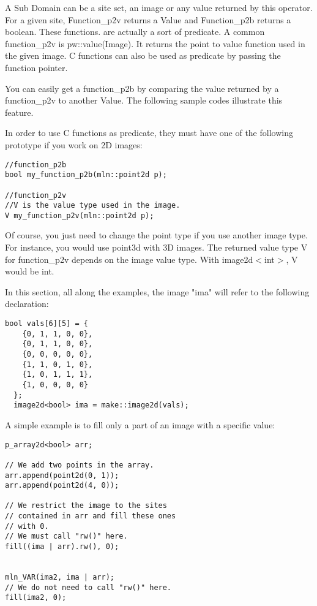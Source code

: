 \documentclass{report}
\begin{document}
A Sub Domain can be a site set, an image or any value returned by this
operator.
For a given site, Function\_p2v returns a Value and Function\_p2b returns a
boolean. These functions. are actually a sort of predicate. A common
function\_p2v is pw::value(Image). It returns the
point to value function used in the given image. C functions can also be used as
predicate by passing the function pointer.

You can easily get a function\_p2b by comparing the value returned 
by a function\_p2v to another Value.
The following sample codes illustrate this feature.

In order to use C functions as predicate, they must have one of the following
prototype if you work on 2D images:
\begin{lstlisting}[frame=single]
//function_p2b
bool my_function_p2b(mln::point2d p);

//function_p2v
//V is the value type used in the image.
V my_function_p2v(mln::point2d p);
\end{lstlisting}
Of course, you just need to change the point type if you use another image
type. For instance, you would use point3d with 3D images.
The returned value type V for function\_p2v depends on the image value type.
With image2d$<$int$>$, V would be int.

In this section, all along the examples, the image "ima" will refer to the
following declaration:
\begin{lstlisting}[frame=single]
  bool vals[6][5] = {
    {0, 1, 1, 0, 0},
    {0, 1, 1, 0, 0},
    {0, 0, 0, 0, 0},
    {1, 1, 0, 1, 0},
    {1, 0, 1, 1, 1},
    {1, 0, 0, 0, 0}
  };
  image2d<bool> ima = make::image2d(vals);
\end{lstlisting}

A simple example is to fill only a part of an image with a specific value:
\begin{lstlisting}[frame=single]
p_array2d<bool> arr;

// We add two points in the array.
arr.append(point2d(0, 1));
arr.append(point2d(4, 0));

// We restrict the image to the sites
// contained in arr and fill these ones
// with 0.
// We must call "rw()" here.
fill((ima | arr).rw(), 0);


mln_VAR(ima2, ima | arr);
// We do not need to call "rw()" here.
fill(ima2, 0);
\end{lstlisting}
\end{document}
